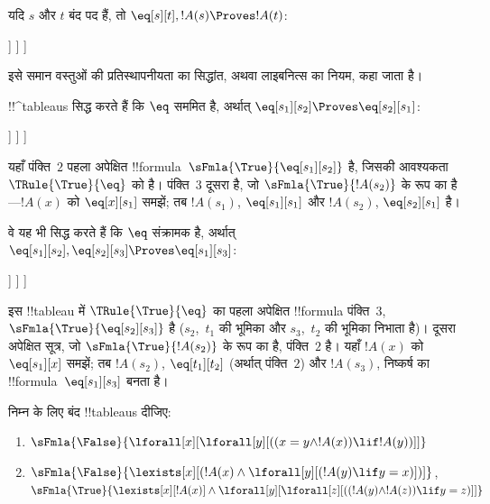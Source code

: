 \documentclass[../../../include/open-logic-section]{subfiles}
\begin{document}
\begin{ex}
यदि $s$ और $t$ बंद पद हैं, तो $\eq[s][t], !A(s)
\Proves !A(t)$:
\begin{oltableau}
  [\sFmla{\False}{\formula{A}(t)}, just = \TAss
    [\sFmla{\True}{\eq[s][t]}, just = \TAss
      [\sFmla{\True}{\formula{A}(s)}, just = \TAss
        [\sFmla{\True}{\formula{A}(t)}, just={\TRule{\True}{\eq}[2, 3]}, close]
      ]
    ]
  ]
\end{oltableau}
इसे समान वस्तुओं की प्रतिस्थापनीयता का सिद्धांत, अथवा लाइबनित्स का नियम,
कहा जाता है।

!!^{tableau}s सिद्ध करते हैं कि $\eq$ सममित है, अर्थात्
$\eq[s_1][s_2]
\Proves \eq[s_2][s_1]$:
\begin{oltableau}
  [\sFmla{\False}{\eq[s_2][s_1]}, just = \TAss
    [\sFmla{\True}{\eq[s_1][s_2]}, just = \TAss
      [\sFmla{\True}{\eq[s_1][s_1]}, just = {$\eq$}
        [\sFmla{\True}{\eq[s_2][s_1]}, just = {\TRule{\True}{\eq}[2, 3]}, close]
      ]
    ]
  ]
\end{oltableau}
यहाँ पंक्ति~$2$ पहला अपेक्षित
!!{formula}~$\sFmla{\True}{\eq[s_1][s_2]}$ है, जिसकी आवश्यकता
$\TRule{\True}{\eq}$ को है। पंक्ति~$3$ दूसरा है, जो
$\sFmla{\True}{!A(s_2)}$ के रूप का है---$!A(x)$ को $\eq[x][s_1]$ समझें;
तब $!A(s_1)$, $\eq[s_1][s_1]$ और $!A(s_2)$, $\eq[s_2][s_1]$ है।

वे यह भी सिद्ध करते हैं कि $\eq$ संक्रामक है, अर्थात्
$\eq[s_1][s_2],
\eq[s_2][s_3] \Proves \eq[s_1][s_3]$:
\begin{oltableau}
  [\sFmla{\False}{\eq[s_1][s_3]}, just = \TAss
    [\sFmla{\True}{\eq[s_1][s_2]}, just = \TAss
      [\sFmla{\True}{\eq[s_2][s_3]}, just = \TAss
        [\sFmla{\True}{\eq[s_1][s_3]}, just = {\TRule{\True}{\eq}[3, 2]}, close]
      ]
    ]
  ]
\end{oltableau}
इस !!{tableau} में $\TRule{\True}{\eq}$ का पहला अपेक्षित !!{formula}
पंक्ति~$3$, $\sFmla{\True}{\eq[s_2][s_3]}$ है ($s_2$,~$t_1$ की भूमिका
और $s_3$,~$t_2$ की भूमिका निभाता है)। दूसरा अपेक्षित सूत्र, जो
$\sFmla{\True}{!A(s_2)}$ के रूप का है, पंक्ति~$2$ है। यहाँ $!A(x)$ को
$\eq[s_1][x]$ समझें; तब $!A(s_2)$, $\eq[t_1][t_2]$ (अर्थात् पंक्ति~$2$)
और $!A(s_3)$, निष्कर्ष का !!{formula}~$\eq[s_1][s_3]$ बनता है।
\end{ex}

\begin{prob}
निम्न के लिए बंद !!{tableau}s दीजिए:
\begin{enumerate}
\item $\sFmla{\False}{\lforall[x][\lforall[y][((x = y \land !A(x))
      \lif !A(y))]]}$
\item $\sFmla{\False}{\lexists[x][(!A(x) \land
    \lforall[y][(!A(y) \lif y = x)])]}$,\\
  $\sFmla{\True}{\lexists[x][!A(x)] \land
    \lforall[y][\lforall[z][((!A(y) \land !A(z)) \lif y = z)]]}$
\end{enumerate}
\end{prob}
\end{document}
